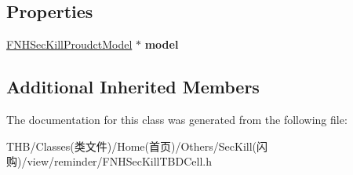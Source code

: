 \subsection*{Properties}
\begin{DoxyCompactItemize}
\item 
\mbox{\label{interface_f_n_h_sec_kill_t_b_d_cell_a6a0531efde3d3620a84855ce87acd590}} 
\mbox{\hyperlink{interface_f_n_h_sec_kill_proudct_model}{F\+N\+H\+Sec\+Kill\+Proudct\+Model}} $\ast$ {\bfseries model}
\end{DoxyCompactItemize}
\subsection*{Additional Inherited Members}


The documentation for this class was generated from the following file\+:\begin{DoxyCompactItemize}
\item 
T\+H\+B/\+Classes(类文件)/\+Home(首页)/\+Others/\+Sec\+Kill(闪购)/view/reminder/F\+N\+H\+Sec\+Kill\+T\+B\+D\+Cell.\+h\end{DoxyCompactItemize}
